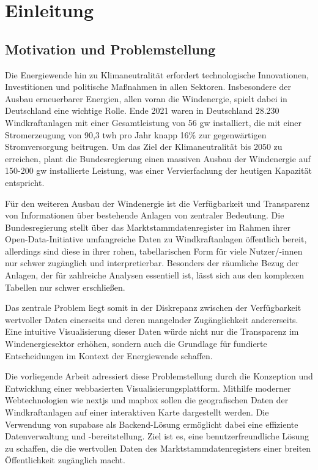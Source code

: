 \section{Einleitung}
\subsection{Motivation und Problemstellung}
Die Energiewende hin zu Klimaneutralität erfordert technologische Innovationen, Investitionen und politische Maßnahmen in allen Sektoren. Insbesondere der Ausbau erneuerbarer Energien, allen voran die Windenergie, spielt dabei in Deutschland eine wichtige Rolle. Ende 2021 waren in Deutschland 28.230 Windkraftanlagen mit einer Gesamtleistung von 56 \gls{gw} installiert, die mit einer Stromerzeugung von 90,3 \gls{twh} pro Jahr knapp 16\% zur gegenwärtigen Stromversorgung beitrugen. Um das Ziel der Klimaneutralität bis 2050 zu erreichen, plant die Bundesregierung einen massiven Ausbau der Windenergie auf 150-200 \gls{gw} installierte Leistung, was einer Vervierfachung der heutigen Kapazität entspricht. %

Für den weiteren Ausbau der Windenergie ist die Verfügbarkeit und Transparenz von Informationen über bestehende Anlagen von zentraler Bedeutung. Die Bundesregierung stellt über das Marktstammdatenregister im Rahmen ihrer Open-Data-Initiative umfangreiche Daten zu Windkraftanlagen öffentlich bereit, allerdings sind diese in ihrer rohen, tabellarischen Form für viele Nutzer/-innen nur schwer zugänglich und interpretierbar. Besonders der räumliche Bezug der Anlagen, der für zahlreiche Analysen essentiell ist, lässt sich aus den komplexen Tabellen nur schwer erschließen.

Das zentrale Problem liegt somit in der Diskrepanz zwischen der Verfügbarkeit wertvoller Daten einerseits und deren mangelnder Zugänglichkeit andererseits. Eine intuitive Visualisierung dieser Daten würde nicht nur die Transparenz im Windenergiesektor erhöhen, sondern auch die Grundlage für fundierte Entscheidungen im Kontext der Energiewende schaffen. %

Die vorliegende Arbeit adressiert diese Problemstellung durch die Konzeption und Entwicklung einer webbasierten Visualisierungsplattform. Mithilfe moderner Webtechnologien wie \gls{nextjs} und \gls{mapbox} sollen die geografischen Daten der Windkraftanlagen auf einer interaktiven Karte dargestellt werden. Die Verwendung von \gls{supabase} als Backend-Lösung ermöglicht dabei eine effiziente Datenverwaltung und -bereitstellung. Ziel ist es, eine benutzerfreundliche Lösung zu schaffen, die die wertvollen Daten des Marktstammdatenregisters einer breiten Öffentlichkeit zugänglich macht.


% 